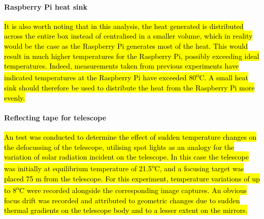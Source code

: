 \paragraph{Raspberry Pi heat sink}

\hl{It is also worth noting that in this analysis, the heat generated is distributed across the entire box instead of centralised in a smaller volume, which in reality would be the case as the Raspberry Pi generates most of the heat. This would result in much higher temperatures for the Raspberry Pi, possibly exceeding ideal temperatures. Indeed, measurements taken from previous experiments have indicated temperatures at the Raspberry Pi have exceeded 80\textsuperscript{o}C. A small heat sink should therefore be used to distribute the heat from the Raspberry Pi more evenly.} \\ 

\paragraph{Reflecting tape for telescope}
\hl{An test was conducted to determine the effect of sudden temperature changes on the defocussing of the telescope, utilising spot lights as an analogy for the variation of solar radiation incident on the telescope. In this case the telescope was initially at equilibrium temperature of 21.5\textsuperscript{o}C, and a focusing target was placed 75 m from the telescope. For this experiment, temperature variations of up to 8\textsuperscript{o}C were recorded alongside the corresponding image captures. An obvious focus drift was recorded and attributed to geometric changes due to sudden thermal gradients on the telescope body and to a lesser extent on the mirrors.}


